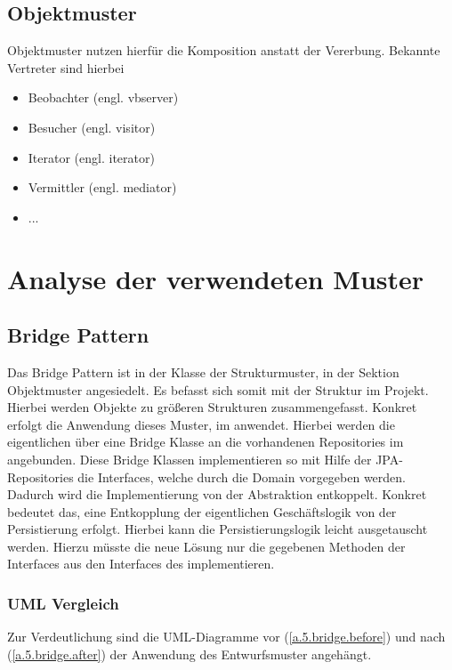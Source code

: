 			\subsection{Objektmuster}
			Objektmuster nutzen hierfür die Komposition anstatt der Vererbung. Bekannte Vertreter sind hierbei
			\begin{itemize}
				\item Beobachter (engl. vbserver)
				\item Besucher (engl. visitor)
				\item Iterator (engl. iterator)
				\item Vermittler (engl. mediator) %
				\item ...
			\end{itemize}
		
	\section{Analyse der verwendeten Muster}
		\subsection{Bridge Pattern} \label{5.bridge}
		Das Bridge Pattern ist in der Klasse der Strukturmuster, in der Sektion Objektmuster angesiedelt. Es befasst sich somit mit der Struktur im Projekt. Hierbei werden Objekte zu größeren Strukturen zusammengefasst. Konkret erfolgt die Anwendung dieses Muster, im  anwendet. Hierbei werden die eigentlichen  über eine Bridge Klasse an die vorhandenen Repositories im  angebunden. Diese Bridge Klassen implementieren so mit Hilfe der JPA-Repositories die Interfaces, welche durch die Domain vorgegeben werden. \\
		Dadurch wird die Implementierung von der Abstraktion entkoppelt. Konkret bedeutet das, eine Entkopplung der eigentlichen Geschäftslogik von der Persistierung erfolgt. Hierbei kann die Persistierungslogik leicht ausgetauscht werden. Hierzu müsste die neue Lösung nur die gegebenen Methoden der Interfaces aus den Interfaces des  implementieren.
	
			\subsubsection{UML Vergleich}
			Zur Verdeutlichung sind die \ac{UML}-Diagramme vor (\cref{a.5.bridge.before}) und nach (\cref{a.5.bridge.after}) der Anwendung des Entwurfsmuster angehängt.
			
